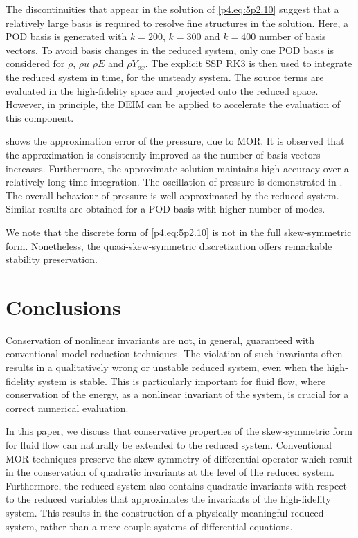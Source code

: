 The discontinuities that appear in the solution of \eqref{p4.eq:5p2.10} suggest that a relatively large basis is required to resolve fine structures in the solution. Here, a POD basis is generated with $k=200$, $k=300$ and $k=400$ number of basis vectors. To avoid basis changes in the reduced system, only one POD basis is considered for $\rho$, $\rho u$ $\rho E$ and $\rho Y_{ox}$. The explicit SSP RK3 is then used to integrate the reduced system in time, for the unsteady system. The source terms are evaluated in the high-fidelity space and projected onto the reduced space. However, in principle, the DEIM can be applied to accelerate the evaluation of this component. 

 shows the approximation error of the pressure, due to MOR. It is observed that the approximation is consistently improved as the number of basis vectors increases. Furthermore, the approximate solution maintains high accuracy over a relatively long time-integration. The oscillation of pressure is demonstrated in . The overall behaviour of pressure is well approximated by the reduced system. Similar results are obtained for a POD basis with higher number of modes.

We note that the discrete form of \eqref{p4.eq:5p2.10} is not in the full skew-symmetric form. Nonetheless, the quasi-skew-symmetric discretization offers remarkable stability preservation.

\section{Conclusions} \label{p4.sec:con}

Conservation of nonlinear invariants are not, in general, guaranteed with conventional model reduction techniques. The violation of such invariants often results in a qualitatively wrong or unstable reduced system, even when the high-fidelity system is stable. This is particularly important for fluid flow, where conservation of the energy, as a nonlinear invariant of the system, is crucial for a correct numerical evaluation.

In this paper, we discuss that conservative properties of the skew-symmetric form for fluid flow can naturally be extended to the reduced system. Conventional MOR techniques preserve the skew-symmetry of differential operator which result in the conservation of quadratic invariants at the level of the reduced system. Furthermore, the reduced system also contains quadratic invariants with respect to the reduced variables that approximates the invariants of the high-fidelity system. This results in the construction of a physically meaningful reduced system, rather than a mere couple systems of differential equations.

